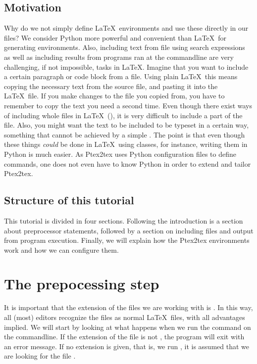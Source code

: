 \documentclass[a4paper,11pt]{article}
\begin{document}
\subsection{Motivation}
Why do we not simply define \LaTeX~environments and use these directly in our
files? We consider Python more powerful and convenient than \LaTeX~for
generating environments. Also, including text from file using search
expressions as well as
including results from programs ran at the commandline are very challenging, if
not impossible, tasks in \LaTeX. Imagine that you want to include a certain
paragraph or code block from a file. Using plain \LaTeX~this means copying the
necessary text from the source file, and pasting it into the \LaTeX~file. If
you make changes to the file you copied from, you have to remember to copy the
text you need a second time. Even though there exist ways of including whole
files in \LaTeX~(), it is very difficult to include a part
of the file. Also, you might want the text to be included to
be typeset in a certain way, something that cannot be achieved by a simple
. The point is that even though these things \emph{could}
be done in \LaTeX~using classes, for instance, writing them in Python is much
easier. As Ptex2tex uses Python configuration files to define commands, one does not even have to
know Python in order to extend and tailor Ptex2tex.

\subsection{Structure of this tutorial}
This tutorial is divided in four sections. Following the introduction is a
section about preprocessor statements, followed by a section on including files
and output from program execution. Finally, we will explain how the
Ptex2tex environments work and how we can configure them.

\section{The prepocessing step}
It is important that the extension of the files we are working with is
. In this way, all (most) editors recognize the files as normal
\LaTeX~files, with all advantages implied.
We will start by looking at what happens when we run the command
 on the commandline. If the extension of
the file is not , the program will exit with an error
message. If no extension is given, that is, we run , it
is assumed that we are looking for the file .
\end{document}
